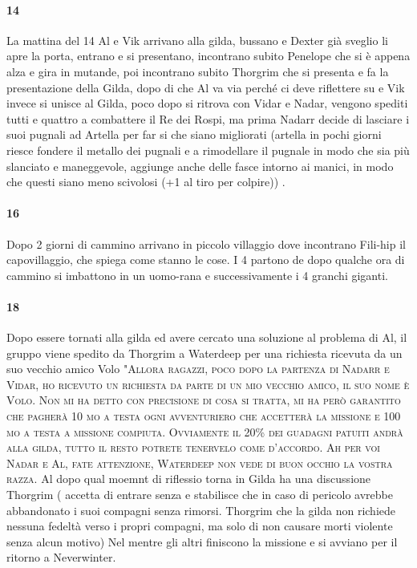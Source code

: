 \documentclass{article}
\begin{document}
                  \paragraph{14}
La mattina del 14 Al e Vik arrivano alla gilda,  bussano e Dexter già sveglio li apre la porta, entrano e si presentano, incontrano subito Penelope che si è appena alza e gira in mutande, poi incontrano subito Thorgrim che si presenta e fa la presentazione della Gilda, dopo di che Al va via perché ci deve riflettere su e Vik invece si unisce al Gilda, poco dopo si ritrova con Vidar e Nadar, vengono spediti tutti e quattro a combattere il Re dei Rospi, ma prima Nadarr decide di lasciare i suoi pugnali ad Artella per far si che siano migliorati (artella in pochi giorni riesce fondere il metallo dei pugnali e a rimodellare il pugnale in modo che sia più slanciato e maneggevole, aggiunge anche delle fasce intorno ai manici, in modo che questi siano meno scivolosi (+1 al tiro per colpire)) . 


                  \paragraph{16}
Dopo 2 giorni di cammino arrivano in piccolo villaggio dove incontrano Fili-hip il capovillaggio, che spiega come stanno le cose. I 4 partono de dopo qualche ora di cammino si imbattono in un uomo-rana e successivamente i 4 granchi giganti.

                  \paragraph{18}

 Dopo essere tornati alla gilda ed avere cercato una soluzione al problema di Al, il gruppo viene spedito da Thorgrim a Waterdeep per una richiesta ricevuta da un suo vecchio amico Volo "\textsc{Allora ragazzi, poco dopo la partenza di Nadarr e Vidar, ho ricevuto un richiesta da parte di un mio vecchio amico, il suo nome è Volo. Non mi ha detto con precisione di cosa si tratta, mi ha però garantito che pagherà 10 mo a testa ogni avventuriero che accetterà la missione e 100 mo a testa a missione compiuta. Ovviamente il 20\% dei guadagni patuiti andrà alla gilda, tutto il resto potrete tenervelo come d'accordo. Ah per voi Nadar e Al, fate attenzione,  Waterdeep non vede di buon occhio la vostra razza}.  Al dopo qual moemnt di riflessio torna in Gilda ha una discussione Thorgrim ( accetta di entrare senza e stabilisce che in caso di pericolo avrebbe abbandonato i suoi compagni senza rimorsi. Thorgrim che la gilda non richiede nessuna fedeltà verso i propri compagni, ma solo di non causare morti violente senza alcun motivo) 
   Nel mentre gli altri finiscono la missione e si avviano per il ritorno a Neverwinter. 
\end{document}
